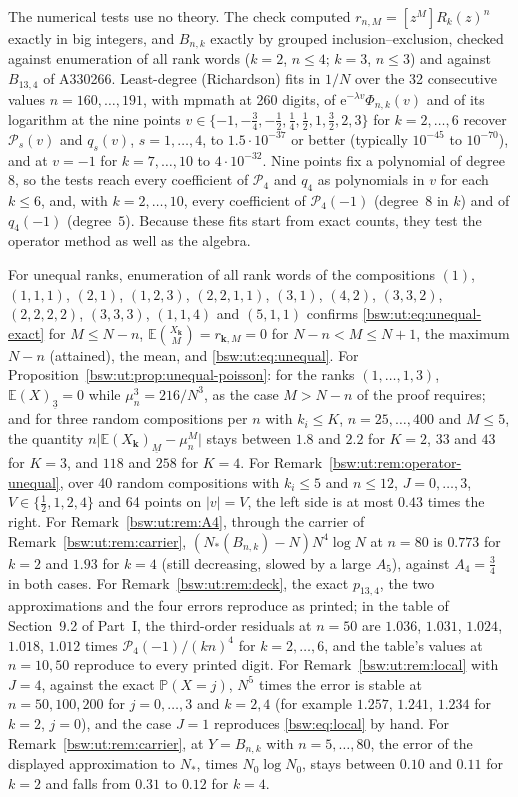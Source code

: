 \documentclass[11pt,letterpaper]{article}
\theoremstyle{definition}
\theoremstyle{remark}
\newcommand{\EE}{\mathbb E}
\newcommand{\PP}{\mathbb P}
\newcommand{\ee}{\mathrm e}
\newcommand{\fall}[2]{(#1)_{\underline{#2}}}
\newcommand{\coef}[2]{[#1]#2}
\begin{document}
The numerical tests use no theory.  The check computed
$r_{n,M}=\coef{z^M}{R_k(z)^n}$ exactly in big integers, and $B_{n,k}$
exactly by grouped inclusion--exclusion, checked against enumeration of
all rank words ($k=2$, $n\le4$; $k=3$, $n\le3$) and against $B_{13,4}$ of
A330266.  Least-degree (Richardson) fits in $1/N$ over the 32 consecutive
values $n=160,\ldots,191$, with mpmath at 260 digits, of
$\ee^{-\lambda v}\Phi_{n,k}(v)$ and of its logarithm at the nine points
$v\in\{-1,-\frac34,-\frac12,\frac14,\frac12,1,\frac32,2,3\}$ for
$k=2,\ldots,6$ recover $\mathcal P_s(v)$ and $q_s(v)$, $s=1,\ldots,4$, to
$1.5\cdot10^{-37}$ or better (typically $10^{-45}$ to $10^{-70}$), and at
$v=-1$ for $k=7,\ldots,10$ to $4\cdot10^{-32}$.  Nine points fix a
polynomial of degree~$8$, so the tests reach every coefficient of
$\mathcal P_4$ and $q_4$ as polynomials in $v$ for each $k\le6$, and, with
$k=2,\ldots,10$, every coefficient of $\mathcal P_4(-1)$ (degree~$8$ in
$k$) and of $q_4(-1)$ (degree~$5$).  Because these fits start from exact
counts, they test the operator method as well as the algebra.

For unequal ranks, enumeration of all rank words of the compositions
$(1)$, $(1,1,1)$, $(2,1)$, $(1,2,3)$, $(2,2,1,1)$, $(3,1)$, $(4,2)$,
$(3,3,2)$, $(2,2,2,2)$, $(3,3,3)$, $(1,1,4)$ and $(5,1,1)$ confirms
\eqref{bsw:ut:eq:unequal-exact} for $M\le N-n$,
$\EE\binom{X_{\mathbf k}}M=r_{\mathbf k,M}=0$ for $N-n<M\le N+1$, the
maximum $N-n$ (attained),
the mean, and \eqref{bsw:ut:eq:unequal}.  For
Proposition~\ref{bsw:ut:prop:unequal-poisson}: for the ranks
$(1,\ldots,1,3)$, $\EE\fall X3=0$ while $\mu_n^3=216/N^3$, as the case
$M>N-n$ of the proof requires; and for three random compositions per $n$
with $k_i\le K$, $n=25,\ldots,400$ and $M\le5$, the quantity
$n\bigl|\EE\fall{X_{\mathbf k}}M-\mu_n^M\bigr|$ stays between $1.8$ and
$2.2$ for $K=2$, $33$ and $43$ for $K=3$, and $118$ and $258$ for $K=4$.
For Remark~\ref{bsw:ut:rem:operator-unequal}, over 40 random compositions
with $k_i\le5$ and $n\le12$, $J=0,\ldots,3$, $V\in\{\frac12,1,2,4\}$ and
64 points on $|v|=V$, the left side is at most $0.43$ times the right.
For Remark~\ref{bsw:ut:rem:A4}, through the carrier of
Remark~\ref{bsw:ut:rem:carrier}, $(N_*(B_{n,k})-N)N^4\log N$ at $n=80$ is
$0.773$ for $k=2$ and $1.93$ for $k=4$ (still decreasing, slowed by a large
$A_5$), against $A_4=\frac34$ in both cases.  For
Remark~\ref{bsw:ut:rem:deck}, the exact $p_{13,4}$, the two approximations
and the four errors reproduce as printed; in the table of Section~9.2 of Part~I,
the third-order residuals at $n=50$ are $1.036$, $1.031$, $1.024$,
$1.018$, $1.012$ times $\mathcal P_4(-1)/(kn)^4$ for $k=2,\ldots,6$, and
the table's values at $n=10,50$ reproduce to every printed digit.  For
Remark~\ref{bsw:ut:rem:local} with $J=4$, against the exact $\PP(X=j)$,
$N^5$ times the error is stable at $n=50,100,200$ for $j=0,\ldots,3$ and
$k=2,4$ (for example $1.257$, $1.241$, $1.234$ for $k=2$, $j=0$), and the
case $J=1$ reproduces \eqref{bsw:eq:local} by hand.  For
Remark~\ref{bsw:ut:rem:carrier}, at $Y=B_{n,k}$ with $n=5,\ldots,80$, the
error of the displayed approximation to $N_*$, times $N_0\log N_0$, stays
between $0.10$ and $0.11$ for $k=2$ and falls from $0.31$ to $0.12$ for
$k=4$.
\end{document}
